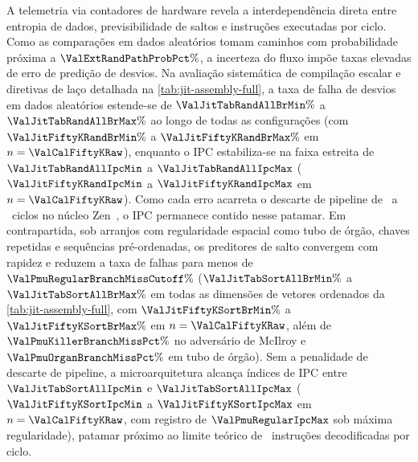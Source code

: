\documentclass[12pt]{article}
\begin{document}
A telemetria via contadores de hardware revela a interdependência direta entre entropia de dados, previsibilidade de saltos e instruções executadas por ciclo. Como as comparações em dados aleatórios tomam caminhos com probabilidade próxima a $\ValExtRandPathProbPct\%$, a incerteza do fluxo impõe taxas elevadas de erro de predição de desvios. Na avaliação sistemática de compilação escalar e diretivas de laço detalhada na \cref{tab:jit-assembly-full}, a taxa de falha de desvios em dados aleatórios estende-se de $\ValJitTabRandAllBrMin\%$ a $\ValJitTabRandAllBrMax\%$ ao longo de todas as configurações (com $\ValJitFiftyKRandBrMin\%$ a $\ValJitFiftyKRandBrMax\%$ em $n = \ValCalFiftyKRaw$), enquanto o IPC estabiliza-se na faixa estreita de $\ValJitTabRandAllIpcMin$ a $\ValJitTabRandAllIpcMax$ ($\ValJitFiftyKRandIpcMin$ a $\ValJitFiftyKRandIpcMax$ em $n = \ValCalFiftyKRaw$). Como cada erro acarreta o descarte de pipeline de \ValZenDiscardCyclesMin\ a \ValZenDiscardCyclesMax\ ciclos no núcleo Zen~\ValZenArchGeneration, o IPC permanece contido nesse patamar. Em contrapartida, sob arranjos com regularidade espacial como tubo de órgão, chaves repetidas e sequências pré-ordenadas, os preditores de salto convergem com rapidez e reduzem a taxa de falhas para menos de $\ValPmuRegularBranchMissCutoff\%$ ($\ValJitTabSortAllBrMin\%$ a $\ValJitTabSortAllBrMax\%$ em todas as dimensões de vetores ordenados da \cref{tab:jit-assembly-full}, com $\ValJitFiftyKSortBrMin\%$ a $\ValJitFiftyKSortBrMax\%$ em $n = \ValCalFiftyKRaw$, além de $\ValPmuKillerBranchMissPct\%$ no adversário de McIlroy e $\ValPmuOrganBranchMissPct\%$ em tubo de órgão). Sem a penalidade de descarte de pipeline, a microarquitetura alcança índices de IPC entre $\ValJitTabSortAllIpcMin$ e $\ValJitTabSortAllIpcMax$ ($\ValJitFiftyKSortIpcMin$ a $\ValJitFiftyKSortIpcMax$ em $n = \ValCalFiftyKRaw$, com registro de $\ValPmuRegularIpcMax$ sob máxima regularidade), patamar próximo ao limite teórico de \ValPmuZenMaxDecoded\ instruções decodificadas por ciclo.
\end{document}
